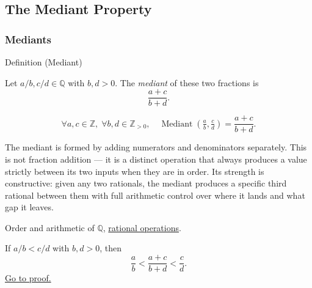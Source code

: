 
\subsection*{The Mediant Property}
\label{sec:mediant}

\subsubsection*{Mediants}

\begin{definitionbox}{Definition (Mediant)}
\begin{definition}[Mediant]
\label{def:mediant}
Let $a/b, c/d \in \mathbb{Q}$ with $b, d > 0$.
The \emph{mediant} of these two fractions is
\[
\frac{a+c}{b+d}.
\]
\end{definition}
\end{definitionbox}

\begin{remark*}
\[
\forall a,c \in \mathbb{Z},\; \forall b,d \in \mathbb{Z}_{>0},\quad
\operatorname{Mediant}\!\left(\tfrac{a}{b},\tfrac{c}{d}\right)
= \frac{a+c}{b+d}.
\]
\end{remark*}

\begin{remark*}[Interpretation]
The mediant is formed by adding numerators and denominators separately.
This is not fraction addition --- it is a distinct operation that always
produces a value strictly between its two inputs when they are in order.
Its strength is constructive: given any two rationals, the mediant produces
a specific third rational between them with full arithmetic control over
where it lands and what gap it leaves.
\end{remark*}

\begin{dependencies}
Order and arithmetic of $\mathbb{Q}$,
\hyperref[def:rational-operations]{rational operations}.
\end{dependencies}

\begin{theorem}
\label{thm:mediant-inequality}
If $a/b < c/d$ with $b, d > 0$, then
\[
\frac{a}{b} < \frac{a+c}{b+d} < \frac{c}{d}.
\]
\hyperref[prf:mediant-inequality]{Go to proof.}
\end{theorem}

